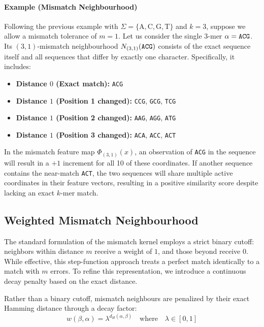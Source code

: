 \paragraph{Example (Mismatch Neighbourhood)}
Following the previous example with $\Sigma = \{\text{A}, \text{C}, \text{G}, \text{T}\}$ and $k=3$, suppose we allow a mismatch tolerance of $m=1$. 
Let us consider the single $3$-mer $\alpha = \text{\texttt{ACG}}$. Its $(3,1)$-mismatch neighbourhood $N_{(3,1)}(\text{\texttt{ACG}})$ consists of the exact sequence itself and all sequences that differ by exactly one character. Specifically, it includes:
\begin{itemize}
    \item \textbf{Distance $0$ (Exact match):} \texttt{ACG}
    \item \textbf{Distance $1$ (Position 1 changed):} \texttt{CCG}, \texttt{GCG}, \texttt{TCG}
    \item \textbf{Distance $1$ (Position 2 changed):} \texttt{AAG}, \texttt{AGG}, \texttt{ATG}
    \item \textbf{Distance $1$ (Position 3 changed):} \texttt{ACA}, \texttt{ACC}, \texttt{ACT}
\end{itemize}
In the mismatch feature map $\Phi_{(3,1)}(x)$, an observation of \texttt{ACG} in the sequence will result in a $+1$ increment for all 10 of these coordinates. 
If another sequence contains the near-match \texttt{ACT}, the two sequences will share multiple active coordinates in their feature vectors, resulting in a positive similarity score despite lacking an exact $k$-mer match.

\subsection{Weighted Mismatch Neighbourhood}\label{sec:weighted-mismatch}

The standard formulation of the mismatch kernel employs a strict binary cutoff: neighbors within distance $m$ receive a weight of $1$, and those beyond receive $0$. While effective, this step-function approach treats a perfect match identically to a match with $m$ errors. To refine this representation, we introduce a continuous decay penalty based on the exact distance.

\begin{definizione}\label{def:weighted-mismatch}
Rather than a binary cutoff, mismatch neighbours are penalized by their exact Hamming distance through a decay factor:
\begin{equation}\label{eq:weighted-mismatch}
w(\beta, \alpha) = \lambda^{d_H(\alpha, \beta)} \quad \text{where} \quad \lambda \in [0, 1]
\end{equation}
\end{definizione}

